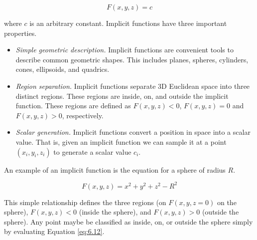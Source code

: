 \begin{equation}\label{eq:6.11}
F(x,y,z) = c
\end{equation}

where $c$ is an arbitrary constant. Implicit functions have three
important properties.

\begin{itemize}

\item \emph{Simple geometric description.} Implicit functions are convenient tools to describe common geometric shapes. This includes planes, spheres, cylinders, cones, ellipsoids, and quadrics.

\item \emph{Region separation.} Implicit functions separate 3D Euclidean space into three distinct regions. These regions are inside, on, and outside the implicit function. These regions are defined as $F(x,y,z) < 0$, $F(x,y,z) = 0$ and $F(x,y,z) > 0$, respectively.

\item \emph{Scalar generation.} Implicit functions convert a position in space into a scalar value. That is, given an implicit function we can sample it at a point $(x_i,y_i,z_i)$ to generate a scalar value $c_i$.

\end{itemize}

An example of an implicit function is the equation for a sphere of radius $R$.

\begin{equation}\label{eq:6.12}
F(x,y,z) = x^2 + y^2 + z^2 - R^2
\end{equation}

This simple relationship defines the three regions (on $F(x,y,z = 0)$ on the sphere), $F(x,y,z) < 0$ (inside the sphere), and $F(x,y,z) > 0$ (outside the sphere). Any point maybe be classified as inside, on, or outside the sphere simply by evaluating Equation \ref{eq:6.12}.


